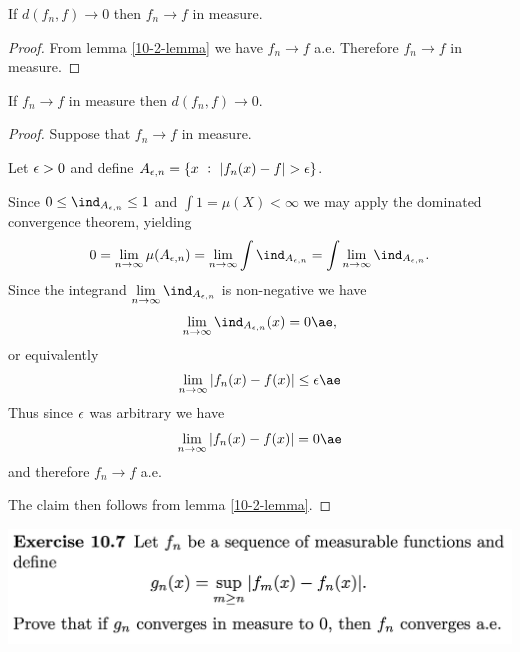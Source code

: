 \begin{claim*}
 If $d(f_n, f) \to 0$ then $f_n \to f$ in measure.
\end{claim*}

\begin{proof}
  From lemma \ref{10-2-lemma} we have $f_n \to f$ a.e. Therefore $f_n \to f$ in measure.
\end{proof}

\begin{claim*}
  If $f_n \to f$ in measure then $d(f_n, f) \to 0$.
\end{claim*}

\begin{proof}
  Suppose that $f_n \to f$ in measure.

  Let $\epsilon > 0$ and define $A_{\epsilon, n} = \{x ~:~ |f_n(x) - f| > \epsilon\}$.

  Since $0 \leq \ind_{A_{\eps, n}} \leq 1$ and $\int 1 = \mu(X) < \infty$ we may apply the dominated
  convergence theorem, yielding
  \begin{align*}
    0 = \limn \mu(A_{\eps, n}) = \limn \int \ind_{A_{\eps, n}} = \int \limn \ind_{A_{\eps, n}}.
  \end{align*}
  Since the integrand $\limn \ind_{A_{\eps, n}}$ is non-negative we have
  \begin{align*}
    \limn \ind_{A_{\eps, n}}(x) = 0 \ae,
  \end{align*}
  or equivalently
  \begin{align*}
    \limn |f_n(x) - f(x)| \leq \eps \ae
  \end{align*}
  Thus since $\epsilon$ was arbitrary we have
  \begin{align*}
    \limn |f_n(x) - f(x)| = 0 \ae
  \end{align*}
  and therefore
  $f_n \to f$ a.e.

  The claim then follows from lemma \ref{10-2-lemma}.
\end{proof}


\newpage
\begin{mdframed}
\includegraphics[width=400pt]{img/analysis--berkeley-202a-hw09-ea17.png}
\end{mdframed}